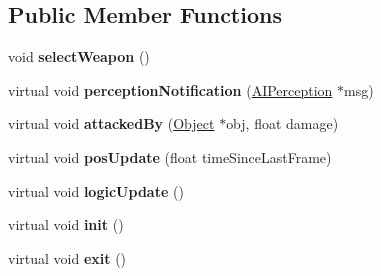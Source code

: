 \subsection*{\-Public \-Member \-Functions}
\begin{DoxyCompactItemize}
\item 
\hypertarget{classAIHandlerBot_a86e179c1e31a47338b63e81dac865854}{
void {\bfseries select\-Weapon} ()}
\label{d9/d8c/classAIHandlerBot_a86e179c1e31a47338b63e81dac865854}

\item 
\hypertarget{classAIHandlerBot_ae781efedd9372cb19b8e3a485e52ed5f}{
virtual void {\bfseries perception\-Notification} (\hyperlink{classAIPerception}{\-A\-I\-Perception} $\ast$msg)}
\label{d9/d8c/classAIHandlerBot_ae781efedd9372cb19b8e3a485e52ed5f}

\item 
\hypertarget{classAIHandlerBot_a4e08a817ea2a7c1ec21d05efd66ec7dc}{
virtual void {\bfseries attacked\-By} (\hyperlink{classObject}{\-Object} $\ast$obj, float damage)}
\label{d9/d8c/classAIHandlerBot_a4e08a817ea2a7c1ec21d05efd66ec7dc}

\item 
\hypertarget{classAIHandlerBot_a1e293d321cb54c36794129b90dfeec89}{
virtual void {\bfseries pos\-Update} (float time\-Since\-Last\-Frame)}
\label{d9/d8c/classAIHandlerBot_a1e293d321cb54c36794129b90dfeec89}

\item 
\hypertarget{classAIHandlerBot_af3d0ff3f5ba69e890ff4af68498d2c7f}{
virtual void {\bfseries logic\-Update} ()}
\label{d9/d8c/classAIHandlerBot_af3d0ff3f5ba69e890ff4af68498d2c7f}

\item 
\hypertarget{classAIHandlerBot_aa246ca75a93f16cb7b7f30fe71abd082}{
virtual void {\bfseries init} ()}
\label{d9/d8c/classAIHandlerBot_aa246ca75a93f16cb7b7f30fe71abd082}

\item 
\hypertarget{classAIHandlerBot_a034bc4e265b5d68925c9e52ce7ad7478}{
virtual void {\bfseries exit} ()}
\label{d9/d8c/classAIHandlerBot_a034bc4e265b5d68925c9e52ce7ad7478}

\end{DoxyCompactItemize}
